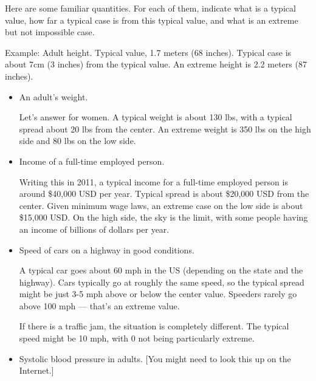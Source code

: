 
Here are some familiar quantities.  For each of them, indicate what is
a typical value, how far a typical case is from this typical value,
and what is an extreme but not impossible case.

Example: Adult height.  Typical value, 1.7 meters (68 inches).  Typical case
is about 7cm (3 inches) from the typical value.  An extreme height is
2.2 meters (87 inches).

\begin{itemize}

\item An adult's weight.\TextEntry[itemname=weight]

\begin{AnswerText}
Let's answer for women.  A typical weight is about 130 lbs, with a
typical spread about 20 lbs from the center.  An extreme weight is 350
lbs on the high side and 80 lbs on the low side.
\end{AnswerText}

\item Income of a full-time employed person.\TextEntry[itemname=income]

\begin{AnswerText}
Writing this in 2011, a typical income for a full-time employed person
is around \$40,000 USD per year.  Typical spread is about \$20,000 USD
from the center.  Given minimum wage laws, an extreme case on the low
side is about \$15,000 USD.  On the high side, the sky is the limit,
with some people having an income of billions of dollars per year.
\end{AnswerText}

\item Speed of cars on a highway in good conditions.\TextEntry[itemname=speed]

\begin{AnswerText}
A typical car goes about 60 mph in the US (depending on the state and
the highway).  Cars typically go at roughly the same speed, so the
typical spread might be just 3-5 mph above or below the center value.
Speeders rarely go above 100 mph --- that's an extreme value.

If there is a traffic jam, the situation is completely different.  The
typical speed might be 10 mph, with 0 not being particularly extreme.
\end{AnswerText}

\item Systolic blood pressure in adults.  [You might need to look this
  up on the Internet.]\TextEntry[itemname=bp]


\end{itemize}

